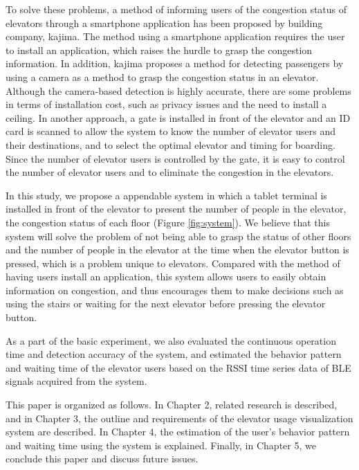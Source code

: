 To solve these problems, a method of informing users of the congestion status of elevators through a smartphone application has been proposed by building company, kajima\cite{kajima}. The method using a smartphone application requires the user to install an application, which raises the hurdle to grasp the congestion information. In addition, kajima\cite{kajima} proposes a method for detecting passengers by using a camera as a method to grasp the congestion status in an elevator.
Although the camera-based detection is highly accurate, there are some problems in terms of installation cost, such as privacy issues and the need to install a ceiling. In another approach, a gate is installed in front of the elevator and an ID card is scanned to allow the system to know the number of elevator users and their destinations, and to select the optimal elevator and timing for boarding\cite{elenavi}. Since the number of elevator users is controlled by the gate, it is easy to control the number of elevator users and to eliminate the congestion in the elevators. 

In this study, we propose a appendable system in which a tablet terminal is installed in front of the elevator to present the number of people in the elevator, the congestion status of each floor (Figure \ref{fig:system}). We believe that this system will solve the problem of not being able to grasp the status of other floors and the number of people in the elevator at the time when the elevator button is pressed, which is a problem unique to elevators. Compared with the method of having users install an application, this system allows users to easily obtain information on congestion, and thus encourages them to make decisions such as using the stairs or waiting for the next elevator before pressing the elevator button. 

As a part of the basic experiment, we also evaluated the continuous operation time and detection accuracy of the system, and estimated the behavior pattern and waiting time of the elevator users based on the RSSI time series data of BLE signals acquired from the system.

This paper is organized as follows. In Chapter 2, related research is described, and in Chapter 3, the outline and requirements of the elevator usage visualization system are described. In Chapter 4, the estimation of the user's behavior pattern and waiting time using the system is explained. Finally, in Chapter 5, we conclude this paper and discuss future issues.
